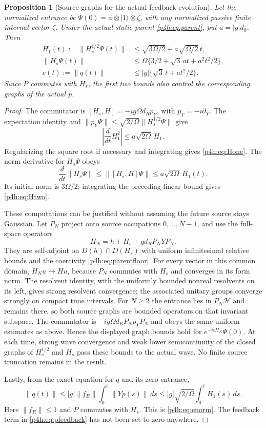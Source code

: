 \documentclass[11pt]{article}
\numberwithin{equation}{section}
\newtheorem{proposition}[theorem]{Proposition}
\theoremstyle{definition}
\theoremstyle{remark}
\begin{document}
\begin{proposition}[Source graphs for the actual feedback evolution]
\label{p4h:prop:actualsource}
Let the normalized entrance be
$\Psi(0)=\phi\otimes|1\rangle\otimes\zeta$, with any normalized
passive finite internal vector $\zeta$. Under the actual static
parent \eqref{p4h:eq:parent}, put $a=|g|d_0$.
Then
\begin{align}
 H_1(t):=\|H_s^{1/2}\Psi(t)\|
 &\leq\sqrt{3\Omega/2}+a\sqrt{\Omega/2}\,t,
 \label{p4h:eq:Hone}\\
 \|H_s\Psi(t)\|
 &\leq\Omega\{3/2+\sqrt3\,at+a^2t^2/2\},
 \label{p4h:eq:Htwo}\\
 e(t):=\|q(t)\|
 &\leq |g|\{\sqrt3\,t+at^2/2\}.
 \label{p4h:eq:enorm}
\end{align}
Since $P$ commutes with $H_s$, the first two bounds also
control the corresponding graphs of the actual $p$.
\end{proposition}
\begin{proof}
The commutator is
$[H_s,H]=-ig\Omega d_Rp_Y$, with $p_Y=-i\partial_Y$.
The expectation identity and
$\|p_Y\Psi\|\leq\sqrt{2/\Omega}\|H_s^{1/2}\Psi\|$ give
\[
 \left|\frac d{dt}H_1^2\right|
      \leq a\sqrt{2\Omega}\,H_1 .
\]
Regularizing the square root if necessary and integrating
gives \eqref{p4h:eq:Hone}.
The norm derivative for $H_s\Psi$ obeys
\[
 \frac d{dt}\|H_s\Psi\|
   \leq\|[H_s,H]\Psi\|
   \leq a\sqrt{2\Omega}\,H_1(t).
\]
Its initial norm is $3\Omega/2$; integrating the preceding
linear bound gives \eqref{p4h:eq:Htwo}.

These computations can be justified without assuming the
future source stays Gaussian. Let $P_N$ project onto source
occupations $0,\ldots,N-1$, and use the full-space operators
\[
 H_N=h+H_s+g d_RP_NYP_N.
\]
They are self-adjoint on $D(h)\cap D(H_s)$ with uniform
infinitesimal relative bounds and the coercivity
\eqref{p4h:eq:parentfloor}. For every vector in this common domain,
$H_Nu\to Hu$, because $P_N$ commutes with $H_s$ and converges
in its form norm. The resolvent identity, with the uniformly bounded
nonreal resolvents on its left, gives strong resolvent convergence;
the associated unitary groups converge strongly on compact time
intervals. For $N\geq2$ the entrance lies in $P_N\mathcal H$ and
remains there, so both source graphs are bounded operators on that
invariant subspace. The commutator is
$-ig\Omega d_RP_Np_YP_N$ and obeys the same uniform estimates as
above. Hence the displayed graph bounds hold for $e^{-itH_N}\Psi(0)$.
At each time, strong wave convergence and weak lower semicontinuity
of the closed graphs of $H_s^{1/2}$ and $H_s$ pass these bounds to
the actual wave. No finite source truncation remains in the result.

Lastly, from the exact equation for $q$ and its zero
entrance,
\[
 \|q(t)\|\leq |g|\|f_R\|\int_0^t\|Yp(s)\|\,ds
 \leq |g|\sqrt{2/\Omega}\int_0^tH_1(s)\,ds .
\]
Here $\|f_R\|\leq1$ and $P$ commutes with $H_s$.
This is \eqref{p4h:eq:enorm}. The feedback term in
\eqref{p4h:eq:pfeedback} has not been set to zero anywhere.
\end{proof}
\end{document}
